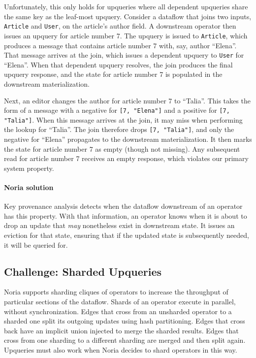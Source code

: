 Unfortunately, this only holds for upqueries where all dependent
upqueries share the same key as the leaf-most upquery. Consider a
dataflow that joins two inputs, \texttt{Article} and \texttt{User}, on the article's
author field. A downstream operator then issues an upquery for article
number 7. The upquery is issued to \texttt{Article}, which produces a message
that contains article number 7 with, say, author ``Elena''. That message
arrives at the join, which issues a dependent upquery to \texttt{User} for
``Elena''. When that dependent upquery resolves, the join produces the
final upquery response, and the state for article number 7 is populated
in the downstream materialization.

Next, an editor changes the author for article number 7 to ``Talia''. This
takes the form of a message with a negative for \texttt{[7, "Elena"]} and a
positive for \texttt{[7, "Talia"]}. When this message arrives at the join, it
may miss when performing the lookup for ``Talia''. The join therefore
drops \texttt{[7, "Talia"]}, and only the negative for ``Elena'' propagates to
the downstream materialization. It then marks the state for article
number 7 as empty (though not missing). Any subsequent read for article
number 7 receives an empty response, which violates our primary system
property.

\paragraph{Noria solution}
Key provenance analysis detects when the dataflow downstream of an operator has
this property. With that information, an operator knows when it is about to drop
an update that \emph{may} nonetheless exist in downstream state. It issues an
eviction for that state, ensuring that if the updated state is subsequently
needed, it will be queried for.

\subsection{Challenge: Sharded Upqueries}

Noria supports sharding cliques of operators to increase the throughput
of particular sections of the dataflow. Shards of an operator execute in
parallel, without synchronization. Edges that cross from an unsharded
operator to a sharded one split its outgoing updates using hash
partitioning. Edges that cross back have an implicit union injected to
merge the sharded results. Edges that cross from one sharding to a
different sharding are merged and then split again. Upqueries must also
work when Noria decides to shard operators in this way.

